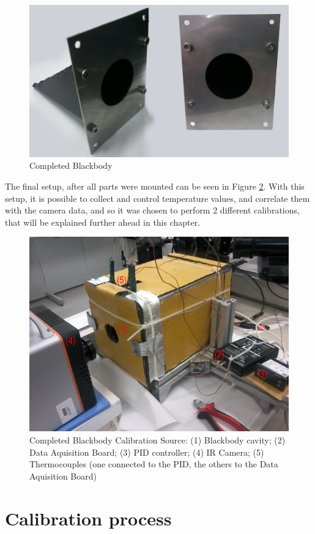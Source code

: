 \begin{figure}[h]
\centering
\includegraphics[width=0.7\linewidth]{Figures/4.Chapter/blackbody.png}
\caption{Completed Blackbody}
\label{fig:blkbdy}
\end{figure}

\par The final setup, after all parts were mounted can be seen in Figure \ref{fig:bbcs}. With this setup, it is possible to collect and control temperature values, and correlate them with the camera data, and so it was chosen to perform 2 different calibrations, that will be explained further ahead in this chapter. \\

\begin{figure}[h]
\centering
\includegraphics[width=0.7\linewidth]{Figures/4.Chapter/complete.png}
\caption{Completed Blackbody Calibration Source: (1) Blackbody cavity; (2) Data Aquisition Board; (3) PID controller; (4) IR Camera; (5) Thermocouples (one connected to the PID, the others to the Data Aquisition Board)}
\label{fig:bbcs}
\end{figure}

\section{Calibration process}

